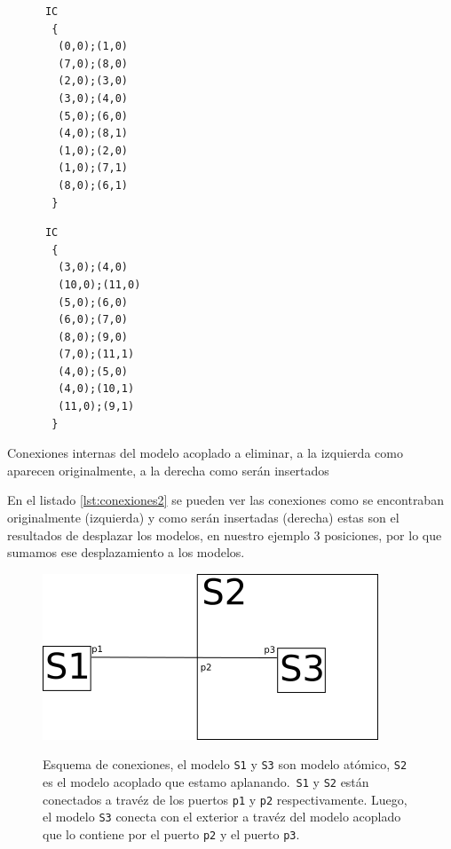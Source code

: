 \begin{itemize}
\begin{listing}
\begin{minipage}[t]{0.5\textwidth}
\begin{verbatim}
      IC
       {
        (0,0);(1,0)
        (7,0);(8,0)
        (2,0);(3,0)
        (3,0);(4,0)
        (5,0);(6,0)
        (4,0);(8,1)
        (1,0);(2,0)
        (1,0);(7,1)
        (8,0);(6,1)
       }
\end{verbatim}
        \end{minipage}
        \begin{minipage}[t]{0.5\textwidth}
\begin{verbatim}
      IC
       {
        (3,0);(4,0)
        (10,0);(11,0)
        (5,0);(6,0)
        (6,0);(7,0)
        (8,0);(9,0)
        (7,0);(11,1)
        (4,0);(5,0)
        (4,0);(10,1)
        (11,0);(9,1)
       }
\end{verbatim}
        \end{minipage}
        \label{lst:conexiones2}
        \caption{Conexiones internas del modelo acoplado a eliminar, a la izquierda como aparecen originalmente, a la derecha como serán insertados}
\end{listing}

        En el listado \ref{lst:conexiones2} se pueden ver las conexiones como se encontraban originalmente (izquierda) y como serán insertadas (derecha)
        estas son el resultados de desplazar los modelos, en nuestro ejemplo $3$ posiciones, por lo que sumamos ese desplazamiento a los modelos.

\begin{figure}[!htbp]
\centering
\includegraphics[width=.75\textwidth]{text3418}
\label{fig:aplanado-ports}
\caption{Esquema de conexiones, el modelo \texttt{S1} y \texttt{S3} son modelo atómico, \texttt{S2} es el modelo acoplado que estamo aplanando.\
	\texttt{S1} y \texttt{S2} están conectados a travéz de los puertos \texttt{p1} y \texttt{p2} respectivamente. Luego, el modelo \texttt{S3} conecta con
	el exterior a travéz del modelo acoplado que lo contiene por el puerto \texttt{p2} y el puerto  \texttt{p3}.
	}
\end{figure}


\end{itemize}
